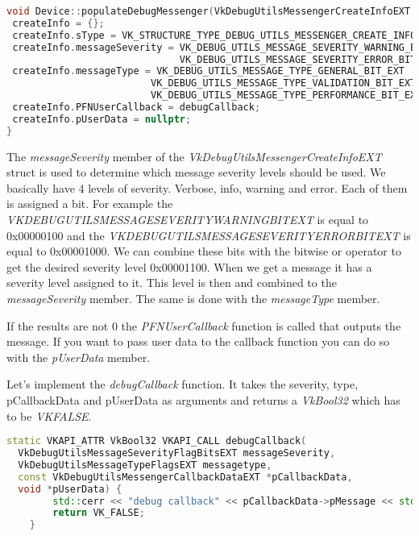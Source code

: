 \documentclass[12pt]{report} \usepackage{preamble}
\begin{document}
\begin{lstlisting}[language=C++]
void Device::populateDebugMessenger(VkDebugUtilsMessengerCreateInfoEXT &createInfo. {
 createInfo = {};
 createInfo.sType = VK_STRUCTURE_TYPE_DEBUG_UTILS_MESSENGER_CREATE_INFO_EXT;
 createInfo.messageSeverity = VK_DEBUG_UTILS_MESSAGE_SEVERITY_WARNING_BIT_EXT |
                              VK_DEBUG_UTILS_MESSAGE_SEVERITY_ERROR_BIT_EXT;
 createInfo.messageType = VK_DEBUG_UTILS_MESSAGE_TYPE_GENERAL_BIT_EXT |
                         VK_DEBUG_UTILS_MESSAGE_TYPE_VALIDATION_BIT_EXT |
                         VK_DEBUG_UTILS_MESSAGE_TYPE_PERFORMANCE_BIT_EXT;
 createInfo.PFNUserCallback = debugCallback;
 createInfo.pUserData = nullptr;
}
\end{lstlisting}

The \textit{messageSeverity} member of the  \textit{VkDebugUtilsMessengerCreateInfoEXT} struct
is used to determine which message severity levels should be used. We basically have 4 levels of
severity. Verbose, info, warning and error. Each of them is assigned a bit. For example the \\
\textit{VK\textunderscore DEBUG\textunderscore UTILS\textunderscore MESSAGE\textunderscore SEVERITY\textunderscore WARNING\textunderscore BIT\textunderscore EXT}
is equal to \\ 0x00000100 and the
\textit{VK\textunderscore DEBUG\textunderscore UTILS\textunderscore MESSAGE\textunderscore SEVERITY\textunderscore ERROR\textunderscore BIT\textunderscore EXT}
is equal to 0x00001000. We can combine these bits with the bitwise or operator to get the desired severity level
0x00001100. When we get a message it has a severity level assigned to it. This level is then and combined to the
\textit{messageSeverity} member. The same is done with the \textit{messageType} member.

If the results are not 0 the \textit{PFNUserCallback} function is called that
outputs the message.  If you want to pass user data to the callback function you can do so with the
\textit{pUserData} member.

Let's implement the \textit{debugCallback} function.
It takes the severity, type, pCallbackData and pUserData as arguments and returns a \textit{VkBool32}
which has to be \textit{VK\textunderscore FALSE}.

\begin{lstlisting}[language=C++]
static VKAPI_ATTR VkBool32 VKAPI_CALL debugCallback(
  VkDebugUtilsMessageSeverityFlagBitsEXT messageSeverity,
  VkDebugUtilsMessageTypeFlagsEXT messagetype,
  const VkDebugUtilsMessengerCallbackDataEXT *pCallbackData,
  void *pUserData) {
		std::cerr << "debug callback" << pCallbackData->pMessage << std::endl;
		return VK_FALSE;
	}
\end{lstlisting}
\end{document}
